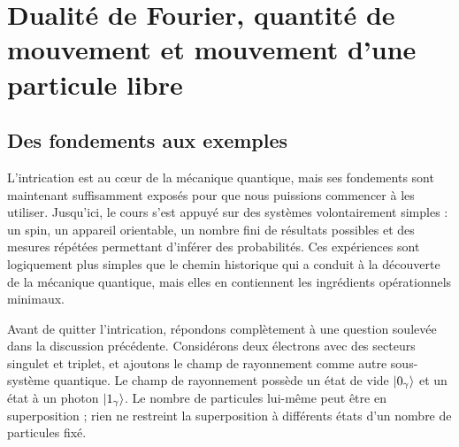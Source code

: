 \chapter{Dualité de Fourier, quantité de mouvement et mouvement d’une particule libre}

\section{Des fondements aux exemples}

L’intrication est au cœur de la mécanique quantique, mais ses fondements sont maintenant suffisamment exposés pour que nous puissions commencer à les utiliser. Jusqu’ici, le cours s’est appuyé sur des systèmes volontairement simples : un spin, un appareil orientable, un nombre fini de résultats possibles et des mesures répétées permettant d’inférer des probabilités. Ces expériences sont logiquement plus simples que le chemin historique qui a conduit à la découverte de la mécanique quantique, mais elles en contiennent les ingrédients opérationnels minimaux.

\begin{classroomqa}
\end{classroomqa}

\begin{classroomqa}
\end{classroomqa}

Avant de quitter l’intrication, répondons complètement à une question soulevée dans la discussion précédente. Considérons deux électrons avec des secteurs singulet et triplet, et ajoutons le champ de rayonnement comme autre sous-système quantique. Le champ de rayonnement possède un état de vide \(\left\lvert0_\gamma\right\rangle\) et un état à un photon \(\left\lvert1_\gamma\right\rangle\). Le nombre de particules lui-même peut être en superposition ; rien ne restreint la superposition à différents états d’un nombre de particules fixé.

